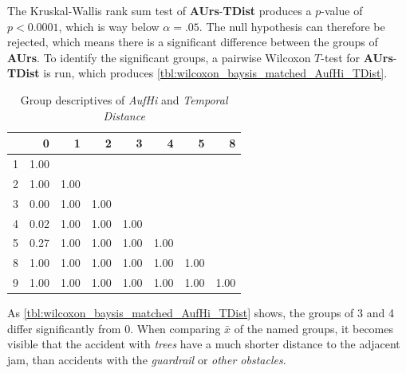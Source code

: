 The Kruskal-Wallis rank sum test of \textbf{AUrs}-\textbf{TDist} produces a $p$-value of $p < 
0.0001$, which is way below $\alpha=.05$. The null hypothesis can therefore be rejected, which means there is a significant difference between the groups of \textbf{AUrs}. To identify the significant groups, a pairwise Wilcoxon $T$-test for \textbf{AUrs}-\textbf{TDist} is run, which produces \autoref{tbl:wilcoxon_baysis_matched_AufHi_TDist}.
\begin{table}[ht]
	\small
	\centering
    \begin{tabular}{rrrrrrrr}
        \toprule
        & 0 & 1 & 2 & 3 & 4 & 5 & 8 \\ 
        \midrule
        1 & 1.00 &  &  &  &  &  &  \\ 
        2 & 1.00 & 1.00 &  &  &  &  &  \\ 
        3 & 0.00 & 1.00 & 1.00 &  &  &  &  \\ 
        4 & 0.02 & 1.00 & 1.00 & 1.00 &  &  &  \\ 
        5 & 0.27 & 1.00 & 1.00 & 1.00 & 1.00 &  &  \\ 
        8 & 1.00 & 1.00 & 1.00 & 1.00 & 1.00 & 1.00 &  \\ 
        9 & 1.00 & 1.00 & 1.00 & 1.00 & 1.00 & 1.00 & 1.00 \\ 
        \bottomrule
      \end{tabular}
	\caption{Group descriptives of \textit{AufHi} and \textit{Temporal Distance}}
	\label{tbl:wilcoxon_baysis_matched_AufHi_TDist}
\end{table}
As \autoref{tbl:wilcoxon_baysis_matched_AufHi_TDist} shows, the groups of 3 and 4 differ significantly from 0. When comparing $\bar{x}$ of the named groups, it becomes visible that the accident with \textit{trees} have a much shorter distance to the adjacent jam, than accidents with the \textit{guardrail} or \textit{other obstacles}.
